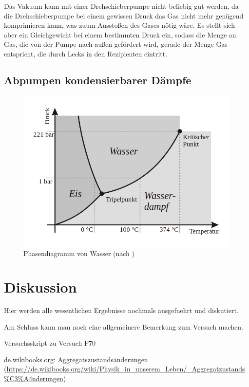 \documentclass[12pt, a4paper]{scrartcl}
\begin{document}
		Das Vakuum kann mit einer Drehschieberpumpe nicht beliebig gut werden, da die Drehschieberpumpe bei einem gewissen Druck das Gas nicht mehr genügend komprimieren kann, was zuum Ausstoßen des Gases nötig wäre. 
		Es stellt sich aber ein Gleichgewicht bei einem bestimmten Druck ein, sodass die Menge an Gas, die von der Pumpe nach außen gefördert wird, gerade der Menge Gas entspricht, die durch Lecks in den Rezipienten eintritt.
		
		
	\subsection{Abpumpen kondensierbarer Dämpfe}
		
		\begin{figure}[H]
			\centering
			\includegraphics[width=.5\paperwidth]{phasen-wasser}
			\caption{Phasendiagramm von Wasser (nach \cite{wikibooks})}
		\end{figure}
	
	
	\section{Diskussion}
	
	Hier werden alle wesentlichen Ergebnisse nochmals ausgefuehrt und diskutiert. 
	
	Am Schluss kann man noch eine allgemeinere Bemerkung zum Versuch machen.
	
	
	\newpage 
	
	\begin{thebibliography}{00}   %
		
		 Versuchsskript zu Versuch F70
		
		 de.wikibooks.org: Aggregatszustandsänderungen\\ (\url{https://de.wikibooks.org/wiki/Physik_in_unserem_Leben/_Aggregatzustands%C3%A4nderungen})
		
	\end{thebibliography}
	
\end{document}
